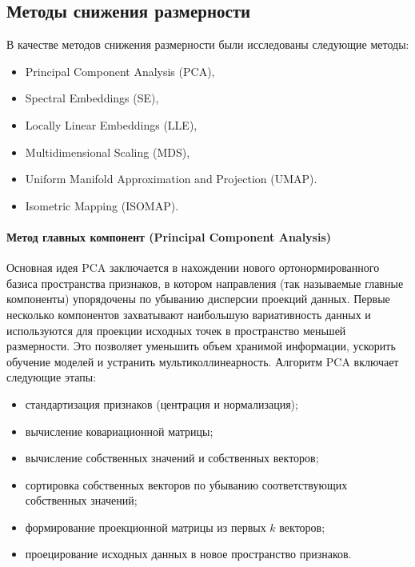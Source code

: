     \subsection*{Методы снижения размерности}
        В качестве методов снижения размерности были исследованы следующие методы:
        \begin{itemize}
            \item Principal Component Analysis (PCA),
            \item Spectral Embeddings (SE),
            \item Locally Linear Embeddings (LLE),
            \item Multidimensional Scaling (MDS),
            \item Uniform Manifold Approximation and Projection (UMAP).
            \item Isometric Mapping (ISOMAP).
        \end{itemize}

        \paragraph{Метод главных компонент (Principal Component Analysis)}
            Основная идея PCA заключается в нахождении нового ортонормированного базиса пространства признаков, в котором направления (так называемые главные компоненты) упорядочены по убыванию дисперсии проекций данных. Первые несколько компонентов захватывают наибольшую вариативность данных и используются для проекции исходных точек в пространство меньшей размерности. Это позволяет уменьшить объем хранимой информации, ускорить обучение моделей и устранить мультиколлинеарность.
            Алгоритм PCA включает следующие этапы:
            \begin{itemize}
                \item стандартизация признаков (центрация и нормализация);
                \item вычисление ковариационной матрицы;
                \item вычисление собственных значений и собственных векторов;
                \item сортировка собственных векторов по убыванию соответствующих собственных значений;
                \item формирование проекционной матрицы из первых \(k\) векторов;
                \item проецирование исходных данных в новое пространство признаков.
            \end{itemize}

